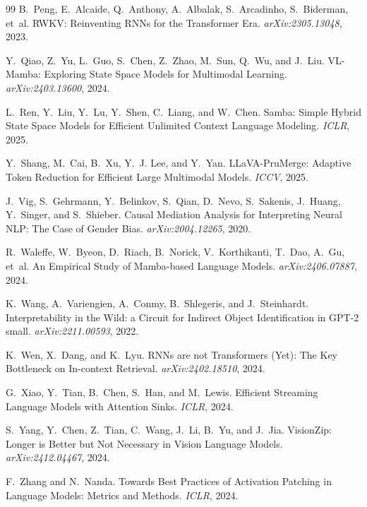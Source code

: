 \documentclass{article}
\begin{document}
\begin{thebibliography}{99}
B.~Peng, E.~Alcaide, Q.~Anthony, A.~Albalak, S.~Arcadinho, S.~Biderman, et~al.
\newblock RWKV: Reinventing RNNs for the Transformer Era.
\emph{arXiv:2305.13048}, 2023.

Y.~Qiao, Z.~Yu, L.~Guo, S.~Chen, Z.~Zhao, M.~Sun, Q.~Wu, and J.~Liu.
\newblock VL-Mamba: Exploring State Space Models for Multimodal Learning.
\emph{arXiv:2403.13600}, 2024.

L.~Ren, Y.~Liu, Y.~Lu, Y.~Shen, C.~Liang, and W.~Chen.
\newblock Samba: Simple Hybrid State Space Models for Efficient Unlimited
Context Language Modeling. \emph{ICLR}, 2025.

Y.~Shang, M.~Cai, B.~Xu, Y.~J. Lee, and Y.~Yan.
\newblock LLaVA-PruMerge: Adaptive Token Reduction for Efficient Large
Multimodal Models. \emph{ICCV}, 2025.

J.~Vig, S.~Gehrmann, Y.~Belinkov, S.~Qian, D.~Nevo, S.~Sakenis, J.~Huang,
Y.~Singer, and S.~Shieber.
\newblock Causal Mediation Analysis for Interpreting Neural NLP: The Case of
Gender Bias. \emph{arXiv:2004.12265}, 2020.

R.~Waleffe, W.~Byeon, D.~Riach, B.~Norick, V.~Korthikanti, T.~Dao, A.~Gu,
et~al.
\newblock An Empirical Study of Mamba-based Language Models.
\emph{arXiv:2406.07887}, 2024.

K.~Wang, A.~Variengien, A.~Conmy, B.~Shlegeris, and J.~Steinhardt.
\newblock Interpretability in the Wild: a Circuit for Indirect Object
Identification in GPT-2 small. \emph{arXiv:2211.00593}, 2022.

K.~Wen, X.~Dang, and K.~Lyu.
\newblock RNNs are not Transformers (Yet): The Key Bottleneck on In-context
Retrieval. \emph{arXiv:2402.18510}, 2024.

G.~Xiao, Y.~Tian, B.~Chen, S.~Han, and M.~Lewis.
\newblock Efficient Streaming Language Models with Attention Sinks.
\emph{ICLR}, 2024.

S.~Yang, Y.~Chen, Z.~Tian, C.~Wang, J.~Li, B.~Yu, and J.~Jia.
\newblock VisionZip: Longer is Better but Not Necessary in Vision Language
Models. \emph{arXiv:2412.04467}, 2024.

F.~Zhang and N.~Nanda.
\newblock Towards Best Practices of Activation Patching in Language Models:
Metrics and Methods. \emph{ICLR}, 2024.


\end{thebibliography}
\end{document}
